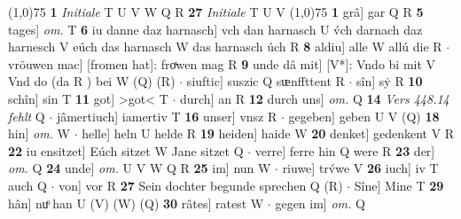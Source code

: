 \documentclass[8pt,a4paper,notitlepage]{article}
\begin{document}
\begin{table}[ht]
\begin{minipage}[t]{0.5\linewidth}
\line(1,0){75} \newline
\textbf{1} \textit{Initiale} T U V W Q R  \textbf{27} \textit{Initiale} T U V  \newline
\line(1,0){75} \newline
\textbf{1} grâ] gar Q R \textbf{5} tages] \textit{om.} T \textbf{6} iu danne daz harnasch] vch dan harnasch U v́ch darnach daz harnesch V eúch das harnasch W das harnasch úch R \textbf{8} aldiu] alle W allú die R  $\cdot$ vröuwen mac] [fromen hat]: froͯwen mag R \textbf{9} unde dâ mit] [V*]: Vndo bi mit V Vnd do (da R ) bei W (Q) (R)  $\cdot$ siuftic] suszic Q sᵫnffttent R  $\cdot$ sîn] sẏ R \textbf{10} schîn] sin T \textbf{11} got] >got< T  $\cdot$ durch] an R \textbf{12} durch uns] \textit{om.} Q \textbf{14} \textit{Vers 448.14 fehlt} Q   $\cdot$ jâmertiuch] iamertiv T \textbf{16} unser] vnsz R  $\cdot$ gegeben] geben U V (Q) \textbf{18} hin] \textit{om.} W  $\cdot$ helle] heln U helde R \textbf{19} heiden] haide W \textbf{20} denket] gedenkent V R \textbf{22} iu ensitzet] Eúch sitzet W Jane sitzet Q  $\cdot$ verre] ferre hin Q were R \textbf{23} der] \textit{om.} Q \textbf{24} unde] \textit{om.} U V W Q R \textbf{25} im] nun W  $\cdot$ riuwe] trv́we V \textbf{26} iuch] iv T auch Q  $\cdot$ von] vor R \textbf{27} Sein dochter begunde sprechen Q (R)  $\cdot$ Sîne] Mine T \textbf{29} hân] nuͦ han U (V) (W) (Q) \textbf{30} râtes] ratest W  $\cdot$ gegen im] \textit{om.} Q \newline
\end{minipage}
\end{table}
\end{document}
